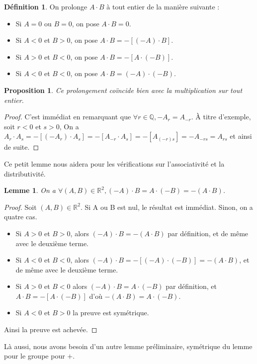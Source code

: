 \documentclass[french]{book}
\theoremstyle{plain}
\newtheorem{lem}{Lemme}[chapter]
\newtheorem{prop}{Proposition}[chapter]
\theoremstyle{definition}
\newtheorem{dfn}{Définition}[chapter]
\theoremstyle{remark}
\begin{document}
\begin{dfn}
	On prolonge $A \cdot B$ à tout entier de la manière suivante :
	\begin{itemize}
	\item Si $A = 0$ ou $B = 0$, on pose $A \cdot B = 0$.
	\item Si $A < 0$ et $B > 0$, on pose $A \cdot B = -[(-A) \cdot B]$.
	\item Si $A > 0$ et $B < 0$, on pose $A \cdot B = -[A \cdot (-B)]$.
	\item Si $A < 0$ et $B < 0$, on pose $A \cdot B = (-A) \cdot (-B)$.
\end{itemize}

\end{dfn}
\begin{prop}
	Ce prolongement coïncide bien avec la multiplication sur tout entier.
\end{prop}
\begin{proof}
	C'est immédiat en remarquant que $\forall r \in \mathbb{Q}, -A_r = A_{-r}$. À titre d'exemple, soit $r < 0$ et $s > 0$, On a $A_r \cdot A_s = -[(-A_r) \cdot A_s] = -[A_{-r} \cdot A_s] = -[A_{(-r)s}] = -A_{-rs} = A_{rs}$ et ainsi de suite.
\end{proof}
Ce petit lemme nous aidera pour les vérifications sur l'associativité et la distributivité.
\begin{lem}
	On a $\forall (A,B) \in \mathbb{R}^2, (-A) \cdot B = A \cdot (-B) = -(A \cdot B)$.
\end{lem}
\begin{proof}
	Soit $(A,B) \in \mathbb{R}^2$. Si A ou B est nul, le résultat est immédiat. Sinon, on a quatre cas.
	\begin{itemize}
		\item Si $A > 0$ et $B > 0$, alors $(-A) \cdot B = -(A \cdot B)$ par définition, et de même avec le deuxième terme.
		\item Si $A < 0$ et $B < 0$, alors $(-A) \cdot B = -[(-A) \cdot (-B)] = -(A \cdot B)$, et de même avec le deuxième terme.
		\item Si $A > 0$ et $B < 0$ alors $(-A) \cdot B = A \cdot (-B)$ par définition, et $A \cdot B = -[A \cdot (-B)]$ d'où $-(A \cdot B) = A \cdot (-B)$.
		\item Si $A < 0$ et $B > 0$ la preuve est symétrique.
	\end{itemize} 
	Ainsi la preuve est achevée.
\end{proof}
Là aussi, nous avons besoin d'un autre lemme préliminaire, symétrique du lemme pour le groupe pour $+$.
\end{document}
